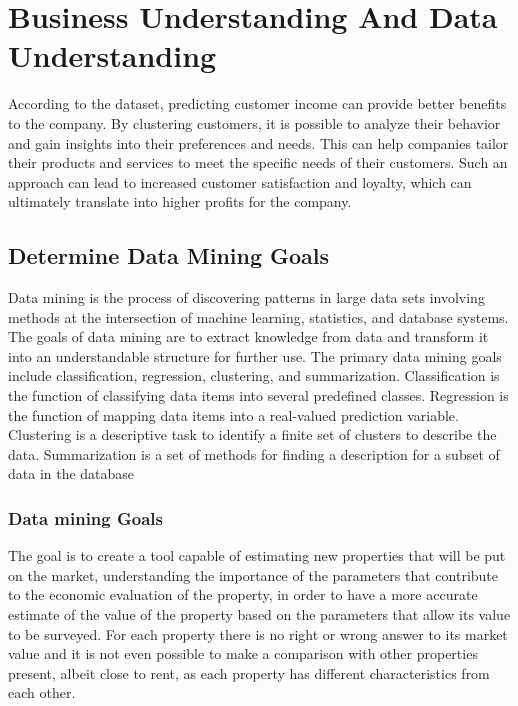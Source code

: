 \chapter{Business Understanding And Data Understanding}

According to the dataset, predicting customer income can provide better benefits to the company. By clustering customers, it is possible to analyze their behavior and gain insights into their preferences and needs. This can help companies tailor their products and services to meet the specific needs of their customers. Such an approach can lead to increased customer satisfaction and loyalty, which can ultimately translate into higher profits for the company. 
\section{Determine Data Mining Goals}

Data mining is the process of discovering patterns in large data sets involving methods at the intersection of machine learning, statistics, and database systems. The goals of data mining are to extract knowledge from data and transform it into an understandable structure for further use. The primary data mining goals include classification, regression, clustering, and summarization. Classification is the function of classifying data items into several predefined classes. Regression is the function of mapping data items into a real-valued prediction variable. Clustering is a descriptive task to identify a finite set of clusters to describe the data. Summarization is a set of methods for finding a description for a subset of data in the database
\subsection{Data mining Goals}
The goal is to create a tool capable of estimating new properties that will be put on the market, understanding the importance of the parameters that contribute to the economic evaluation of the property, in order to have a more accurate estimate of the value of the property based on the parameters that allow its value to be surveyed. For each property there is no right or wrong answer to its market value and it is not even possible to make a comparison with other properties present, albeit close to rent, as each property has different characteristics from each other.


